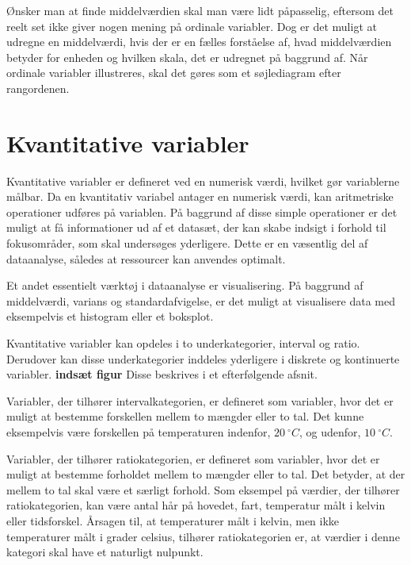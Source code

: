 \documentclass[]{book}
\theoremstyle{definition}
\theoremstyle{definition}
\theoremstyle{definition}
\theoremstyle{remark}
\begin{document}
Ønsker man at finde middelværdien skal man være lidt påpasselig, eftersom det reelt set ikke giver nogen mening på ordinale variabler. Dog er det muligt at udregne en middelværdi, hvis der er en fælles forståelse af, hvad middelværdien betyder for enheden og hvilken skala, det er udregnet på baggrund af. Når ordinale variabler illustreres, skal det gøres som et søjlediagram efter rangordenen.

\citep[ s. 12-13]{ASTAbog}

\hypertarget{kvantitative-variabler}{%
\section{Kvantitative variabler}\label{kvantitative-variabler}}

Kvantitative variabler er defineret ved en numerisk værdi, hvilket gør variablerne målbar. Da en kvantitativ variabel antager en numerisk værdi, kan aritmetriske operationer udføres på variablen. På baggrund af disse simple operationer er det muligt at få informationer ud af et datasæt, der kan skabe indsigt i forhold til fokusområder, som skal undersøges yderligere. Dette er en væsentlig del af dataanalyse, således at ressourcer kan anvendes optimalt.

Et andet essentielt værktøj i dataanalyse er visualisering. På baggrund af middelværdi, varians og standardafvigelse, er det muligt at visualisere data med eksempelvis et histogram eller et boksplot.

Kvantitative variabler kan opdeles i to underkategorier, interval og ratio. Derudover kan disse underkategorier inddeles yderligere i diskrete og kontinuerte variabler. \textbf{indsæt figur} Disse beskrives i et efterfølgende afsnit.

Variabler, der tilhører intervalkategorien, er defineret som variabler, hvor det er muligt at bestemme forskellen mellem to mængder eller to tal. Det kunne eksempelvis være forskellen på temperaturen indenfor, \(20 ~^\circ C\), og udenfor, \(10 ~^\circ C\).

Variabler, der tilhører ratiokategorien, er defineret som variabler, hvor det er muligt at bestemme forholdet mellem to mængder eller to tal. Det betyder, at der mellem to tal skal være et særligt forhold. Som eksempel på værdier, der tilhører ratiokategorien, kan være antal hår på hovedet, fart, temperatur målt i kelvin eller tidsforskel. Årsagen til, at temperaturer målt i kelvin, men ikke temperaturer målt i grader celsius, tilhører ratiokategorien er, at værdier i denne kategori skal have et naturligt nulpunkt.
\end{document}
